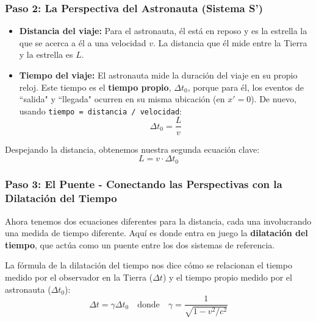 \documentclass[11pt,a4paper]{article}
\begin{document}
\subsubsection*{Paso 2: La Perspectiva del Astronauta (Sistema S')}
\begin{itemize}
    \item \textbf{Distancia del viaje:} Para el astronauta, él está en reposo y es la estrella la que se acerca a él a una velocidad $v$. La distancia que él mide entre la Tierra y la estrella es $L$.
    \item \textbf{Tiempo del viaje:} El astronauta mide la duración del viaje en su propio reloj. Este tiempo es el \textbf{tiempo propio}, $\Delta t_0$, porque para él, los eventos de ``salida" y ``llegada" ocurren en su misma ubicación (en $x'=0$). De nuevo, usando \texttt{tiempo = distancia / velocidad}:
    \[ \Delta t_0 = \frac{L}{v} \]
\end{itemize}
Despejando la distancia, obtenemos nuestra segunda ecuación clave:
\begin{equation} \label{eq:dist_nave}
    L = v \cdot \Delta t_0
\end{equation}

\subsubsection*{Paso 3: El Puente - Conectando las Perspectivas con la Dilatación del Tiempo}
Ahora tenemos dos ecuaciones diferentes para la distancia, cada una involucrando una medida de tiempo diferente. Aquí es donde entra en juego la \textbf{dilatación del tiempo}, que actúa como un puente entre los dos sistemas de referencia.

La fórmula de la dilatación del tiempo nos dice cómo se relacionan el tiempo medido por el observador en la Tierra ($\Delta t$) y el tiempo propio medido por el astronauta ($\Delta t_0$):
\begin{equation} \label{eq:dilatacion}
    \Delta t = \gamma \Delta t_0 \quad \text{donde} \quad \gamma = \frac{1}{\sqrt{1 - v^2/c^2}}
\end{equation}
\end{document}
